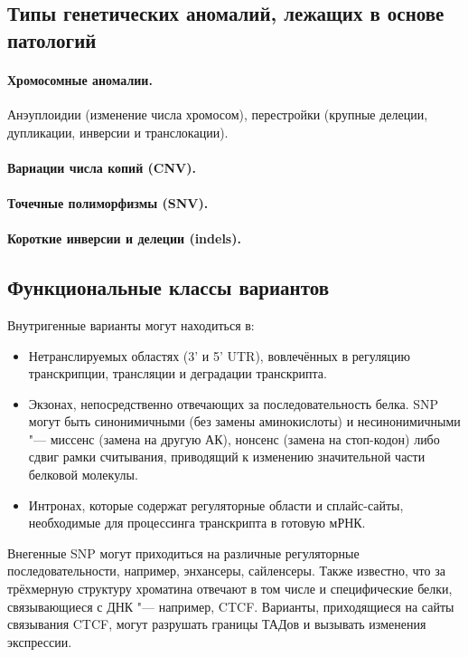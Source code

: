 \documentclass[a4paper,12pt]{article}
\begin{document}
\subsection{Типы генетических аномалий, лежащих в основе патологий}

\paragraph{Хромосомные аномалии.}
Анэуплоидии (изменение числа хромосом), перестройки (крупные делеции, дупликации, инверсии и транслокации).

\paragraph{Вариации числа копий (CNV).}

\paragraph{Точечные полиморфизмы (SNV).}

\paragraph{Короткие инверсии и делеции (indels).}

\subsection{Функциональные классы вариантов}

Внутригенные варианты могут находиться в:

\begin{itemize}
\item Нетранслируемых областях (3' и 5' UTR), вовлечённых в регуляцию транскрипции, трансляции и деградации транскрипта.
\item Экзонах, непосредственно отвечающих за последовательность белка.
SNP могут быть синонимичными (без замены аминокислоты) и несинонимичными "--- миссенс (замена на другую АК), нонсенс (замена на стоп-кодон) либо сдвиг рамки считывания, приводящий к изменению значительной части белковой молекулы.
\item Интронах, которые содержат регуляторные области и сплайс-сайты, необходимые для процессинга транскрипта в готовую мРНК.
\end{itemize}

Внегенные SNP могут приходиться на различные регуляторные последовательности, например, энхансеры, сайленсеры.
Также известно, что за трёхмерную структуру хроматина отвечают в том числе и специфические белки, связывающиеся с ДНК "--- например, CTCF\cite{wutz}.
Варианты, приходящиеся на сайты связывания CTCF, могут разрушать границы ТАДов и вызывать изменения экспрессии.
\end{document}
